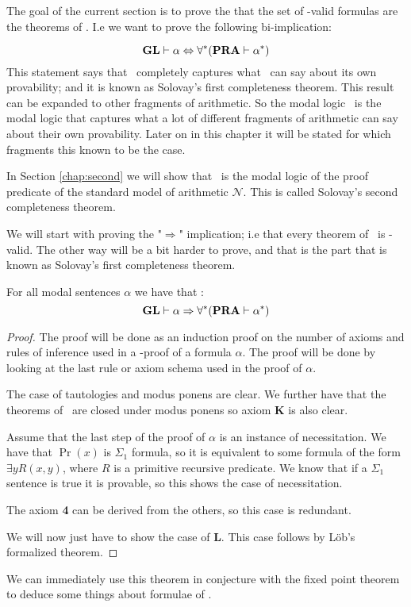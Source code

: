 \documentclass[../main.tex]{subfiles}
\begin{document}
The goal of the current section is to prove the that the set of \PRA-valid
formulas are the theorems of \GL. I.e we want to prove the following bi-implication:

\[\text{\textbf{GL}}\vdash\alpha\Leftrightarrow \forall^*(\text{\textbf{PRA}}\vdash\alpha^*)\]
This statement says that \GL\ completely captures what \PRA\ can say about its own
provability; and it is known as Solovay's first completeness theorem. This result can be 
expanded to other fragments of arithmetic. So
the modal logic \GL\ is the modal logic that captures what a lot of  different fragments of
arithmetic can say about their own provability. Later on in this chapter  it will
be stated for which fragments this
known to be  the case. 

In Section \ref{chap:second} we will show that \GLS\ is the modal logic of the proof
predicate of the standard model of arithmetic $\mathcal{N}$. This is called Solovay's second completeness theorem.

We will start with proving the "$\Rightarrow$" implication; i.e that every
theorem of \GL\ is \PRA-valid. The other way will be a bit harder to prove, and
that is the part that is known as Solovay's first completeness theorem.
\begin{thm}[Soundness]
	For all modal sentences $\alpha$ we have that :
	$$\text{\textbf{GL}}\vdash\alpha\Rightarrow\forall ^*(\text{\textbf{PRA}}\vdash\alpha^*)$$
\end{thm}
\begin{proof}
	The proof will be done as an induction proof on the number of axioms
	and rules of inference used in a \GL-proof of a formula $\alpha$. The
	proof will be done by looking at the last rule or axiom schema used in
	the proof of $\alpha$.

	The case of tautologies and modus ponens are clear. We further have that the theorems of
	\PRA\ are closed under modus ponens so axiom \textbf{K} is also clear. 

	Assume that  the last step of the proof of $\alpha$ is an instance of
	necessitation. We have that $\Pr(x)$ is $\Sigma_1$ formula, so it is equivalent to
	some formula of the form $\exists y R(x,y)$, where $R$ is a primitive
	recursive predicate. We know that if a $\Sigma_1$ sentence is true it
	is provable, so this shows the case of necessitation.

	The axiom \textbf{4} can be derived from the others, so this case is redundant.

	We will now just have to show the case of \textbf{L}. This case follows by
	Löb's formalized theorem.
\end{proof}
We can immediately use this theorem in conjecture with the fixed point theorem
to deduce some things about formulae of \PRA.
\end{document}
